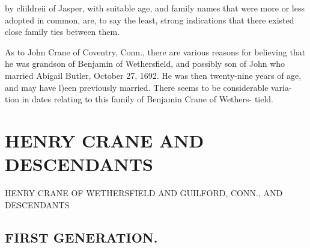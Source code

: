 \documentclass{book}
\begin{document}
by cliildreii of Jasper, with suitable age, and family names that 
were more or less adopted in common, are, to say the least, 
strong indications that there existed close family ties between 
them. 

As to John Crane of Coventry, Conn., there are various reasons 
for believing that he was grandson of Benjamin of Wethersfield, 
and possibly son of John who married Abigail Butler, October 
27, 1692. He was then twenty-nine years of age, and may have 
l)een previously married. There seems to be considerable varia- 
tion in dates relating to this family of Benjamin Crane of Wethers- 
tield. 

\chapter{HENRY CRANE AND DESCENDANTS}

HENRY CRANE OF WETHERSFIELD AND GUILFORD, CONN., AND DESCENDANTS



\section{FIRST GENERATION.}
\end{document}
